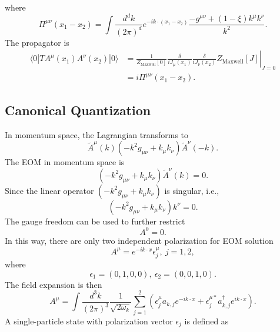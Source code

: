 where
\begin{equation}
	\Pi^{\mu\nu}(x_1-x_2) = \int \frac{d^d k}{(2\pi)^d} e^{-ik\cdot(x_1-x_2)}\frac{-g^{\mu\nu}+(1-\xi)k^\mu k^\nu}{k^2}.
\end{equation}
The propagator is
\begin{equation}
\begin{aligned}
	\langle 0|T A^\mu(x_1) A^\nu(x_2) |0\rangle
	&= \left.\frac{1}{Z_{\mathrm{Maxwell}}[0]}\frac{\delta}{iJ_\mu(x_1)}\frac{\delta}{iJ_\nu(x_2)} Z_{\mathrm{Maxwell}}[J]\right|_{J=0} \\
	&= i\Pi^{\mu\nu}(x_1-x_2).
\end{aligned}
\end{equation}


\subsection{Canonical Quantization}
In momentum space, the Lagrangian transforms to
\begin{equation}
	\tilde{A}^\mu(k)\left(-k^2 g_{\mu\nu}+k_\mu k_\nu\right) \tilde{A}^\nu(-k).
\end{equation}
The EOM in momentum space is
\begin{equation*}
	(-k^2 g_{\mu\nu}+k_\mu k_\nu) \tilde{A}^\nu(k) = 0.
\end{equation*}
Since the linear operator $(-k^2 g_{\mu\nu}+k_\mu k_\nu)$ is singular, i.e.,
\begin{equation*}
	(-k^2 g_{\mu\nu}+k_\mu k_\nu)k^\nu = 0.
\end{equation*}
The gauge freedom can be used to further restrict
\begin{equation*}
	A^0 = 0.
\end{equation*}
In this way, there are only two independent polarization for EOM solution
\begin{equation}
	A^\mu = e^{-ik\cdot x} \epsilon^\mu_j,\ j=1,2,
\end{equation}
where
\begin{equation*}
	\epsilon_1 = (0,1,0,0),\
	\epsilon_2 = (0,0,1,0).
\end{equation*}
The field expansion is then
\begin{equation}
	A^\mu = \int \frac{d^{3} k}{(2\pi)^{3}}\frac{1}{\sqrt{2\omega_k}}
	\sum_{j=1}^2 \left(\epsilon^\mu_j a_{k,j} e^{-ik\cdot x} + 
	\epsilon^{\mu*}_j a^\dagger_{k,j} e^{ik\cdot x}\right).
\end{equation}
A single-particle state with polarization vector $\epsilon_j$ is defined as

